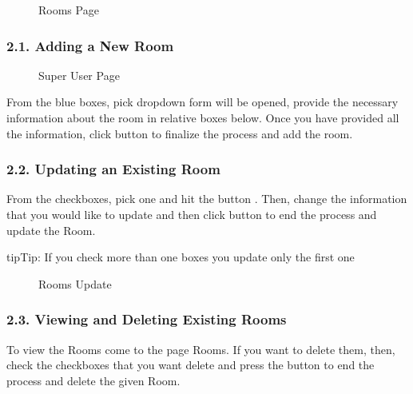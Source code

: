 \documentclass[letterpaper,10pt,english]{sphinxmanual}
\begin{document}
\begin{figure}[htbp]
\centering
\capstart

\noindent{}
\caption{Rooms Page}\label{\detokenize{user/berkay:id4}}\end{figure}


\subsubsection{2.1. Adding a New Room}
\label{\detokenize{user/berkay:adding-a-new-room}}
\begin{figure}[htbp]
\centering
\capstart

\noindent{}
\caption{Super User Page}\label{\detokenize{user/berkay:id5}}\end{figure}

From the blue boxes, pick  dropdown form will be opened, provide the necessary information
about the room in relative boxes below. Once you have provided all the information, click 
button to finalize the process and add the room.


\subsubsection{2.2. Updating an Existing Room}
\label{\detokenize{user/berkay:updating-an-existing-room}}
From the checkboxes, pick one and hit the button . Then, change the information that
you would like to update and then click  button to end the process and update the Room.

\begin{sphinxadmonition}{tip}{Tip:}
If you check more than one boxes you update only the first one
\end{sphinxadmonition}

\begin{figure}[htbp]
\centering
\capstart

\noindent{}
\caption{Rooms Update}\label{\detokenize{user/berkay:id6}}\end{figure}


\subsubsection{2.3. Viewing and Deleting Existing Rooms}
\label{\detokenize{user/berkay:viewing-and-deleting-existing-rooms}}
To view the Rooms come to the page Rooms. If you want to delete them,
then, check the checkboxes that you want delete and press the  button to
end the process and delete the given Room.
\end{document}
